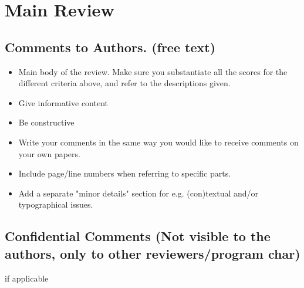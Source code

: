 \documentclass[a4paper]{article}
\begin{document}
\section{Main Review}

\subsection{Comments to Authors. (free text)}

\begin{itemize}
	\item Main body of the review. Make sure you substantiate all the scores for the different criteria above, and refer to the descriptions given.
	\item Give informative content
	\item Be constructive
	\item Write your comments in the same way you would like to receive comments on your own papers.
	\item Include page/line numbers when referring to specific parts.
	\item Add a separate "minor details" section for e.g. (con)textual and/or typographical issues.
\end{itemize}


\subsection{Confidential Comments (Not visible to the authors, only to other reviewers/program char)}

if applicable



 
\end{document}
